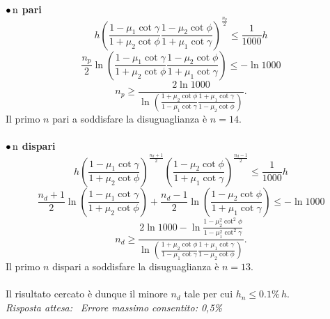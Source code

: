 \documentclass[a4paper,12pt]{article}
\begin{document}
\noindent
\textbf{$\bullet \, \boldsymbol{$n$}$ pari}
\[
h \left(\frac{1-\mu_1\cot\gamma}{1+\mu_2\cot\phi}\frac{1-\mu_2\cot\phi}{1+\mu_1\cot\gamma}\right)^{\frac{n_p}{2}} \leq  \frac{1}{1000}h \tag{4.5}
\]
\[
 \frac{n_p}{2}\ln{\left(\frac{1-\mu_1\cot\gamma}{1+\mu_2\cot\phi}\frac{1-\mu_2\cot\phi}{1+\mu_1\cot\gamma}\right)} \leq -\ln{1000} \tag{4.6}
\]
\[
n_p \geq \frac{2 \ln{1000}}{\ln{\left(\frac{1+\mu_2\cot\phi}{1-\mu_1\cot\gamma}\frac{1+\mu_1\cot\gamma}{1-\mu_2\cot\phi}\right)}}. \tag{4.7}
\]
Il primo $n$ pari a soddisfare la disuguaglianza è $n = 14$. \\
\\
\noindent
\textbf{$\bullet \, \boldsymbol{$n$}$ dispari}
\[
h \left(\frac{1-\mu_1\cot\gamma}{1+\mu_2\cot\phi}\right)^{\frac{n_d+1}{2}} \left(\frac{1-\mu_2\cot\phi}{1+\mu_1\cot\gamma}\right)^{\frac{n_d-1}{2}} \leq \frac{1}{1000}h \tag{4.8}
\]
\[
\frac{n_d+1}{2}\ln{\left(\frac{1-\mu_1\cot\gamma}{1+\mu_2\cot\phi}\right)} + \frac{n_d-1}{2}\ln{\left(\frac{1-\mu_2\cot\phi}{1+\mu_1\cot\gamma}\right)} \leq -\ln{1000} \tag{4.9}
\]
\[
n_d \geq \frac{2 \ln{1000}-\ln{\frac{1-\mu_2^2\cot^2\phi}{1-\mu_1^2\cot^2\gamma}}}{\ln{\left(\frac{1+\mu_2\cot\phi}{1-\mu_1\cot\gamma}\frac{1+\mu_1\cot\gamma}{1-\mu_2\cot\phi}\right)}}. \tag{4.10}
\]
Il primo $n$ dispari a soddisfare la disuguaglianza è $n = 13$. \\
\\
Il risultato cercato è dunque il minore $n_d$ tale per cui $h_n \leq 0.1 \% \, h$. \\

\textit{Risposta attesa:}  \, \textit{Errore massimo consentito: 0,5\%}
\end{document}
